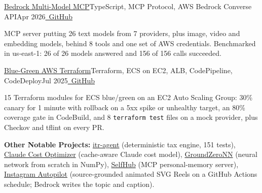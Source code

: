 \resumeExp
{\href{https://github.com/Sagargupta16/bedrock-multi-model-mcp}{Bedrock Multi-Model MCP}}{TypeScript, MCP Protocol, AWS Bedrock Converse API}{Apr 2026}{\href{https://github.com/Sagargupta16/bedrock-multi-model-mcp}{\faGithub\ GitHub}}
\resumeItemListStart
    \item[$\diamond$] MCP server putting 26 text models from 7 providers, plus image, video and embedding models, behind 8 tools and one set of AWS credentials. Benchmarked in us-east-1: 26 of 26 models answered and 156 of 156 calls succeeded.
\resumeItemListEnd

\resumeExp
{\href{https://github.com/Sagargupta16/terraform-aws-ecs-blue-green}{Blue-Green AWS Terraform}}{Terraform, ECS on EC2, ALB, CodePipeline, CodeDeploy}{Jul 2025}{\href{https://github.com/Sagargupta16/terraform-aws-ecs-blue-green}{\faGithub\ GitHub}}
\resumeItemListStart
    \item[$\diamond$] 15 Terraform modules for ECS blue/green on an EC2 Auto Scaling Group: 30\% canary for 1 minute with rollback on a 5xx spike or unhealthy target, an 80\% coverage gate in CodeBuild, and 8 \texttt{terraform test} files on a mock provider, plus Checkov and tflint on every PR.
\resumeItemListEnd

\resumeSubHeadingListEnd
\vspace{-2pt}
\small{\textbf{Other Notable Projects:} \href{https://github.com/Sagargupta16/itr-agent}{itr-agent} (deterministic tax engine, 151 tests), \href{https://github.com/Sagargupta16/claude-cost-optimizer}{Claude Cost Optimizer} (cache-aware Claude cost model), \href{https://github.com/Sagargupta16/GroundZeroNN}{GroundZeroNN} (neural network from scratch in NumPy), \href{https://github.com/Sagargupta16/SelfHub}{SelfHub} (MCP personal-memory server), \href{https://github.com/Sagargupta16/instagram-autopilot}{Instagram Autopilot} (source-grounded animated SVG Reels on a GitHub Actions schedule; Bedrock writes the topic and caption).}
\vspace{-2mm}
